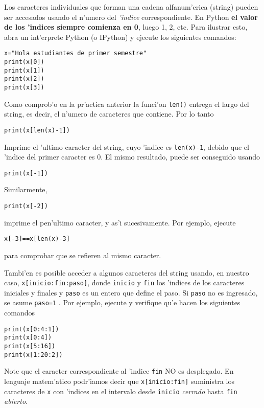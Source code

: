 \documentclass[11pt]{exam}
\begin{document}
\firstpageheadrule
\runningheadrule
{}
\cfoot{ }
\begin{flushleft}
\vspace{0.2in}
\vspace{0.25cm}
\end{flushleft}

\begin{questions}

\item Los caracteres individuales que forman una cadena alfanum'erica (string) pueden ser accesados usando el n'umero del \textit{'indice} correspondiente. En Python \textbf{el valor de los 'indices siempre comienza en 0}, luego 1, 2, etc. Para ilustrar esto, abra un int'erprete Python (o IPython) y ejecute los siguientes comandos:
\begin{verbatim}
x="Hola estudiantes de primer semestre"
print(x[0])
print(x[1])
print(x[2])
print(x[3])
\end{verbatim}
\item Como comprob'o en la pr'actica anterior la funci'on \texttt{len()} entrega el largo del string, es decir, el n'umero de caracteres que contiene. Por lo tanto
\begin{verbatim}
print(x[len(x)-1])
\end{verbatim}
Imprime el 'ultimo caracter del string, cuyo 'indice es \texttt{len(x)-1}, debido que el 'indice del primer caracter es 0. El mismo resultado, puede ser conseguido usando
\begin{verbatim}
print(x[-1])
\end{verbatim}
Similarmente,
\begin{verbatim}
print(x[-2])
\end{verbatim}
imprime el pen'ultimo caracter, y as'i sucesivamente. Por ejemplo, ejecute
\begin{verbatim}
x[-3]==x[len(x)-3]
\end{verbatim}
para comprobar que se refieren al mismo caracter.

\item Tambi'en es posible acceder a algunos caracteres del string usando, en nuestro caso, \texttt{x[inicio:fin:paso]}, donde \texttt{inicio} y \texttt{fin} los 'indices de los caracteres iniciales y finales y \texttt{paso} es un entero que define el paso. Si \texttt{paso} no es ingresado, se asume \texttt{paso=1} . Por ejemplo, ejecute y verifique qu'e hacen los siguientes comandos
\begin{verbatim}
print(x[0:4:1])
print(x[0:4])
print(x[5:16])
print(x[1:20:2])
\end{verbatim}
Note que el caracter correspondiente al 'indice \texttt{fin} NO es desplegado. En lenguaje matem'atico podr'iamos decir que \texttt{x[inicio:fin]} suministra los caracteres de \texttt{x} con 'indices en el intervalo desde \texttt{inicio} \textit{cerrado} hasta \texttt{fin} \textit{abierto}.


\end{questions}
\end{document}

